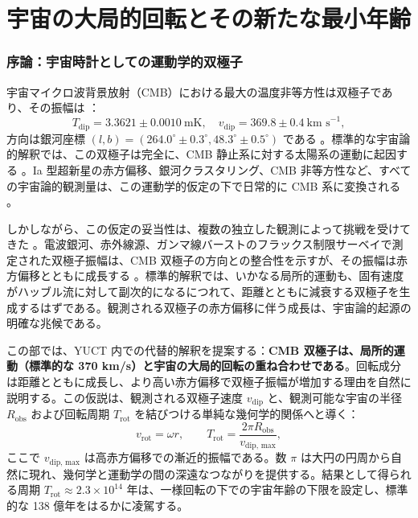 \documentclass[11pt,a4paper]{article}
\begin{document}
	\part{宇宙の大局的回転とその新たな最小年齢}
	\label{part:IV}
	
	\section{序論：宇宙時計としての運動学的双極子}
	
	宇宙マイクロ波背景放射（CMB）における最大の温度非等方性は双極子であり、その振幅は \cite{Planck2018VI, Planck2018VII}：
	\begin{equation}
		T_{\text{dip}} = 3.3621 \pm 0.0010\ \text{mK}, \quad v_{\text{dip}} = 369.8 \pm 0.4\ \text{km s}^{-1},
	\end{equation}
	方向は銀河座標 \((l,b) = (264.0^\circ \pm 0.3^\circ, 48.3^\circ \pm 0.5^\circ)\) である \cite{Planck2018I}。標準的な宇宙論的解釈では、この双極子は完全に、CMB 静止系に対する太陽系の運動に起因する \cite{PlanckIntLVI}。Ia 型超新星の赤方偏移、銀河クラスタリング、CMB 非等方性など、すべての宇宙論的観測量は、この運動学的仮定の下で日常的に CMB 系に変換される \cite{Planck2018V,Planck2018VI}。
	
	しかしながら、この仮定の妥当性は、複数の独立した観測によって挑戦を受けてきた \cite{Gibelyou2012, Yoon2014}。電波銀河、赤外線源、ガンマ線バーストのフラックス制限サーベイで測定された双極子振幅は、CMB 双極子の方向との整合性を示すが、その振幅は赤方偏移とともに成長する \cite{Bengaly2017, Siewert2021, Colin2017, Secrest2025}。標準的解釈では、いかなる局所的運動も、固有速度がハッブル流に対して副次的になるにつれて、距離とともに減衰する双極子を生成するはずである。観測される双極子の赤方偏移に伴う成長は、宇宙論的起源の明確な兆候である。
	
	この部では、YUCT 内での代替的解釈を提案する：\textbf{CMB 双極子は、局所的運動（標準的な 370 km/s）と宇宙の大局的回転の重ね合わせである}。回転成分は距離とともに成長し、より高い赤方偏移で双極子振幅が増加する理由を自然に説明する。この仮説は、観測される双極子速度 \(v_{\text{dip}}\) と、観測可能な宇宙の半径 \(R_{\text{obs}}\) および回転周期 \(T_{\text{rot}}\) を結びつける単純な幾何学的関係へと導く：
	\begin{equation}
		v_{\text{rot}} = \omega r, \qquad T_{\text{rot}} = \frac{2\pi R_{\text{obs}}}{v_{\text{dip, max}}},
	\end{equation}
	ここで \(v_{\text{dip, max}}\) は高赤方偏移での漸近的振幅である。数 \(\pi\) は大円の円周から自然に現れ、幾何学と運動学の間の深遠なつながりを提供する。結果として得られる周期 \(T_{\text{rot}} \approx 2.3 \times 10^{14}\) 年は、一様回転の下での宇宙年齢の下限を設定し、標準的な 138 億年をはるかに凌駕する。
	
\end{document}
